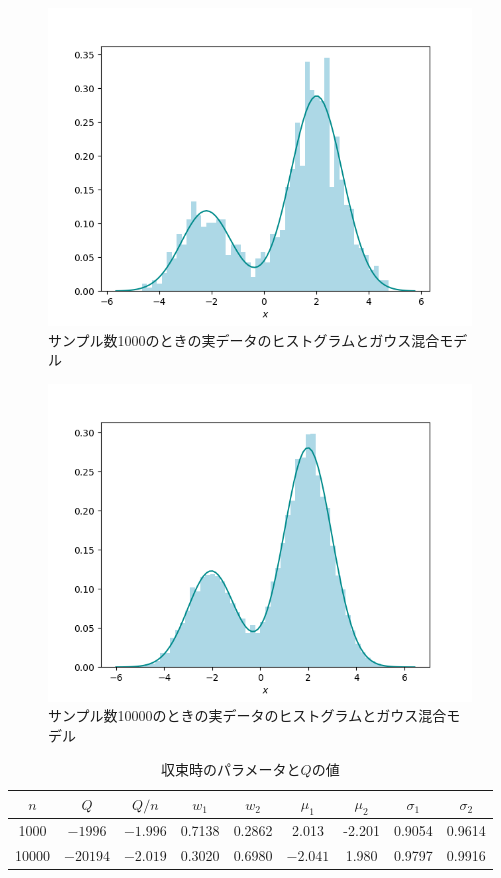 \documentclass[class=jsarticle, crop=false, dvipdfmx, fleqn]{standalone}
\begin{document}
\begin{figure}
    \centering
    \includegraphics[clip, width=12cm]{../figures/assignment2_result_n1000}
    \caption{サンプル数\num{1000}のときの実データのヒストグラムとガウス混合モデル}
    \label{fig:result_n1000}
\end{figure}

\begin{figure}
    \centering
    \includegraphics[clip, width=12cm]{../figures/assignment2_result_n10000}
    \caption{サンプル数\num{10000}のときの実データのヒストグラムとガウス混合モデル}
    \label{fig:result_n10000}
\end{figure}

\vspace*{3\baselineskip}

\begin{table}
    \centering
    \caption{収束時のパラメータと\(Q\)の値}
    \begin{tabular}{ccccccccc}
        \(n\) & \(Q\) & \(Q/n\) & \(w_1\) & \(w_2\) & \(\mu_1\) & \(\mu_2\) & \(\sigma_1\) & \(\sigma_2\) \\ \hline
        \num{1000} & \(-\num{1996}\) & \(-1.996\) & 0.7138 & 0.2862 & 2.013 & -2.201 & 0.9054 & 0.9614 \\
        \num{10000} & \(-\num{20194}\) & \(-2.019\) & 0.3020 & 0.6980 & \(-2.041\) & 1.980 & 0.9797 & 0.9916
    \end{tabular}
    \label{tab:result}
\end{table}
\end{document}
